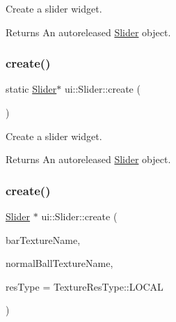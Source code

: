 Create a slider widget.

\begin{DoxyReturn}{Returns}
An autoreleased \hyperlink{classui_1_1Slider}{Slider} object. 
\end{DoxyReturn}
\mbox{\label{classui_1_1Slider_aa78d95ee4b7bf72f80e94cfee6c7a9ae}} 
\subsubsection{\texorpdfstring{create()}{create()}\hspace{0.1cm}{\footnotesize\ttfamily [2/4]}}
{\footnotesize\ttfamily static \hyperlink{classui_1_1Slider}{Slider}$\ast$ ui\+::\+Slider\+::create (\begin{DoxyParamCaption}{ }\end{DoxyParamCaption})\hspace{0.3cm}{\ttfamily [static]}}

Create a slider widget.

\begin{DoxyReturn}{Returns}
An autoreleased \hyperlink{classui_1_1Slider}{Slider} object. 
\end{DoxyReturn}
\mbox{\label{classui_1_1Slider_ad5b871bc3a893142c89336a2ac6d13a4}} 
\subsubsection{\texorpdfstring{create()}{create()}\hspace{0.1cm}{\footnotesize\ttfamily [3/4]}}
{\footnotesize\ttfamily \hyperlink{classui_1_1Slider}{Slider} $\ast$ ui\+::\+Slider\+::create (\begin{DoxyParamCaption}\item[{const std\+::string \&}]{bar\+Texture\+Name,  }\item[{const std\+::string \&}]{normal\+Ball\+Texture\+Name,  }\item[{\hyperlink{classui_1_1Widget_a040a65ec5ad3b11119b7e16b98bd9af0}{Texture\+Res\+Type}}]{res\+Type = {\ttfamily TextureResType\+:\+:LOCAL} }\end{DoxyParamCaption})\hspace{0.3cm}{\ttfamily [static]}}

